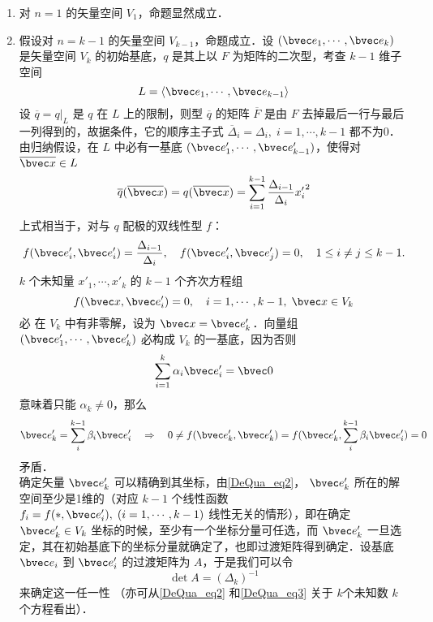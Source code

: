 \begin{enumerate}
\item 对 $n=1$ 的矢量空间 $V_1$，命题显然成立．
\item 假设对 $n=k-1$ 的矢量空间 $V_{k-1}$，命题成立．设 $(\bvec e_1,\cdots,\bvec e_k)$ 是矢量空间 $V_k$ 的初始基底，$q$ 是其上以 $F$ 为矩阵的二次型，考查 $k-1$ 维子空间
\begin{equation}
L=\langle\bvec e_1,\cdots,\bvec e_{k-1}\rangle
\end{equation}
设 $\overline q=q|_L$ 是 $q$ 在 $L$ 上的限制，则型 $\overline q$ 的矩阵 $\overline F$ 是由 $F$ 去掉最后一行与最后一列得到的，故据条件，它的顺序主子式 $\overline\Delta_i=\Delta_i,\;i=1,\cdots,k-1$ 都不为0．由归纳假设，在 $L$ 中必有一基底 $(\bvec e'_1,\cdots,\bvec e'_{k-1})$，使得对 $\overline{\bvec x}\in L$
\begin{equation}
\overline q(\overline{\bvec x})=q(\overline{\bvec x})=\sum_{i=1}^{k-1}\frac{\Delta_{i-1}}{\Delta_i}{x'_{i}}^2
\end{equation}
上式相当于，对与 $q$ 配极的双线性型 $f$：
\begin{equation}
f(\bvec e'_i,\bvec e'_i)=\frac{\Delta_{i-1}}{\Delta_{i}},\quad f(\bvec e'_i,\bvec e'_j)=0,\quad 1\leq i\neq j\leq k-1.
\end{equation}
 $k$ 个未知量 $x'_1,\cdots,x'_k$ 的 $k-1$ 个齐次方程组
 \begin{equation}\label{DeQua_eq2}
 f(\bvec x,\bvec e'_i)=0,\quad i=1,\cdots,k-1,\;\bvec x\in V_k
 \end{equation}
 必 在 $V_k$ 中有非零解，设为 $\bvec x=\bvec e'_k$．向量组 $(\bvec e'_1,\cdots,\bvec e'_k)$ 必构成 $V_k$ 的一基底，因为否则
 \begin{equation}
 \sum_{i=1}^k\alpha_i\bvec e'_i=\bvec 0
 \end{equation}
 意味着只能 $\alpha_k\neq0$，那么 
 \begin{equation}
 \bvec e'_k=\sum_i^{k-1}\beta_i\bvec e'_i\quad
 \Rightarrow\quad 0\neq f(\bvec e'_k,\bvec e'_k)=f(\bvec e'_k,\sum_i^{k-1}\beta_i\bvec e'_i)=0
 \end{equation}
 矛盾．\\

 确定矢量 $\bvec e'_k$ 可以精确到其坐标，由\autoref{DeQua_eq2}， $\bvec e'_k$ 所在的解空间至少是1维的（对应 $k-1$ 个线性函数 $f_i=f(*,\bvec e'_i),\;(i=1,\cdots,k-1)$ 线性无关的情形），即在确定 $\bvec e'_k\in V_k$ 坐标的时候，至少有一个坐标分量可任选，而 $\bvec e'_k$ 一旦选定，其在初始基底下的坐标分量就确定了，也即过渡矩阵得到确定．设基底 $\bvec e_i$ 到 $\bvec e'_i$ 的过渡矩阵为 $A$，于是我们可以令
 \begin{equation}\label{DeQua_eq3}
 \det A=(\Delta_k)^{-1}
 \end{equation}
 来确定这一任一性 （亦可从\autoref{DeQua_eq2} 和\autoref{DeQua_eq3} 关于 $k$个未知数 $k$ 个方程看出）．

\end{enumerate}
